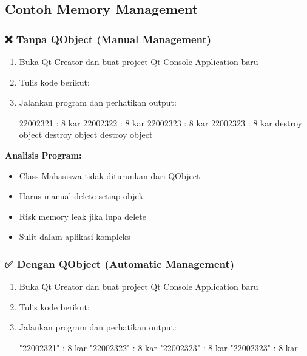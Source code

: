 \subsection{Contoh Memory Management}

\subsubsection{❌ Tanpa QObject (Manual Management)}

\begin{enumerate}
\item Buka Qt Creator dan buat project Qt Console Application baru
\item Tulis kode berikut:



\item Jalankan program dan perhatikan output:

\begin{lcverbatim}
22002321 : 8 kar
22002322 : 8 kar
22002323 : 8 kar
22002323 : 8 kar
destroy object
destroy object
destroy object
\end{lcverbatim}
\end{enumerate}

\textbf{Analisis Program:}
\begin{itemize}
\item Class Mahasiswa tidak diturunkan dari QObject
\item Harus manual delete setiap objek
\item Risk memory leak jika lupa delete
\item Sulit dalam aplikasi kompleks
\end{itemize}

\subsubsection{✅ Dengan QObject (Automatic Management)}

\begin{enumerate}
\item Buka Qt Creator dan buat project Qt Console Application baru
\item Tulis kode berikut:



\item Jalankan program dan perhatikan output:

\begin{lcverbatim}
"22002321"  :  8  kar
"22002322"  :  8  kar
"22002323"  :  8  kar
"22002323"  :  8  kar
\end{lcverbatim}
\end{enumerate}

